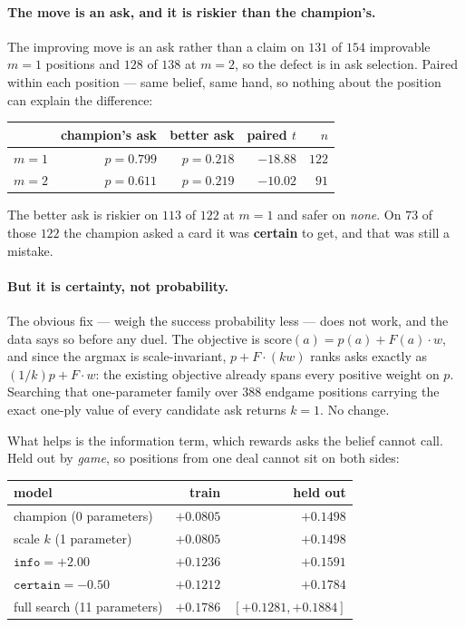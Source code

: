 \documentclass[11pt,a4paper]{article}
\begin{document}
\paragraph{The move is an ask, and it is riskier than the champion's.} The
improving move is an ask rather than a claim on $131$ of $154$ improvable
$m = 1$ positions and $128$ of $138$ at $m = 2$, so the defect is in ask
selection. Paired within each position --- same belief, same hand, so nothing
about the position can explain the difference:

\begin{center}
\begin{tabular}{lrrrr}
\toprule
& champion's ask & better ask & paired $t$ & $n$ \\
\midrule
$m = 1$ & $p = 0.799$ & $p = 0.218$ & $-18.88$ & $122$ \\
$m = 2$ & $p = 0.611$ & $p = 0.219$ & $-10.02$ & $91$ \\
\bottomrule
\end{tabular}
\end{center}

The better ask is riskier on $113$ of $122$ at $m = 1$ and safer on
\emph{none}. On $73$ of those $122$ the champion asked a card it was
\textbf{certain} to get, and that was still a mistake.

\paragraph{But it is certainty, not probability.} The obvious fix --- weigh
the success probability less --- does not work, and the data says so before any
duel. The objective is $\mathrm{score}(a) = p(a) + F(a)\cdot w$, and since the
argmax is scale-invariant, $p + F\cdot(kw)$ ranks asks exactly as
$(1/k)p + F\cdot w$: the existing objective already spans every positive weight
on $p$. Searching that one-parameter family over $388$ endgame positions
carrying the exact one-ply value of every candidate ask returns $k = 1$. No
change.

What helps is the information term, which rewards asks the belief cannot call.
Held out by \emph{game}, so positions from one deal cannot sit on both sides:

\begin{center}
\begin{tabular}{lrr}
\toprule
model & train & held out \\
\midrule
champion (0 parameters)      & $+0.0805$ & $+0.1498$ \\
scale $k$ (1 parameter)      & $+0.0805$ & $+0.1498$ \\
$\mathtt{info} = +2.00$      & $+0.1236$ & $+0.1591$ \\
$\mathtt{certain} = -0.50$   & $+0.1212$ & $+0.1784$ \\
full search (11 parameters)  & $+0.1786$ & $[+0.1281, +0.1884]$ \\
\bottomrule
\end{tabular}
\end{center}
\end{document}
